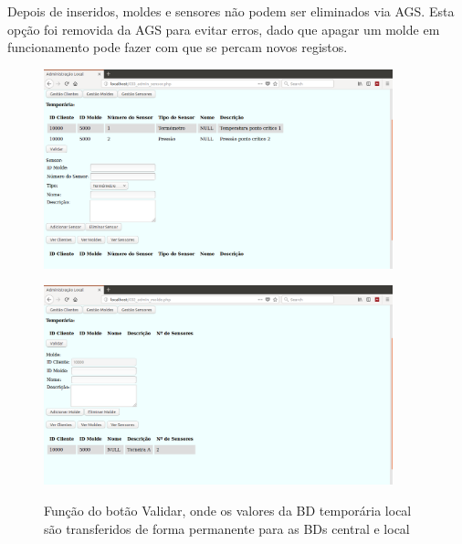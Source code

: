 \documentclass[11pt,twoside,a4paper]{report}
\begin{document}
Depois de inseridos, moldes e sensores não podem ser eliminados via AGS. Esta opção foi removida da AGS para evitar erros, dado que apagar um molde em funcionamento pode fazer com que se percam novos registos.
\begin{figure}[H]
	\centering
	\begin{minipage}{.5\textwidth}
		\begin{center}
			\includegraphics[width=0.9\textwidth]{administracao07} %
			\label{fig:admin12}
		\end{center}
	\end{minipage}%
	\begin{minipage}{.5\textwidth}
		\begin{center}
			\includegraphics[width=0.9\textwidth]{administracao08} %
			\label{fig:admin13}
		\end{center}
	\end{minipage}
	\caption[Função do botão Validar]{Função do botão Validar, onde os valores da BD temporária local são transferidos de forma permanente para as BDs central e local}
	\label{fig:admin11}
\end{figure}
\end{document}
